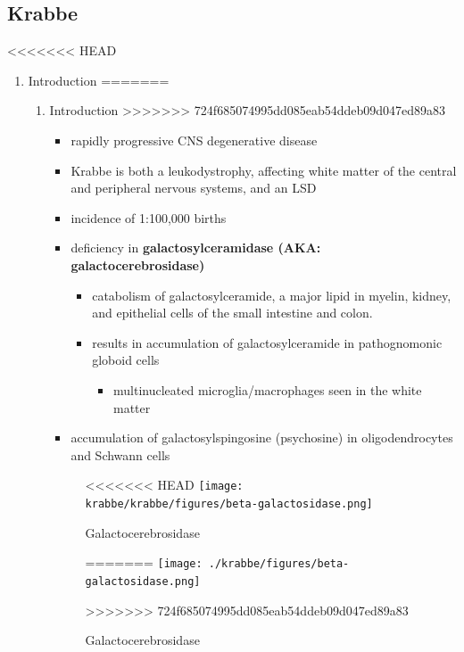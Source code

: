 \documentclass[fontsize=12pt]{scrartcl}
\begin{document}
\begin{enumerate}
\begin{enumerate}
\begin{enumerate}
\begin{enumerate}
\begin{table}[htbp]
\begin{enumerate}
\begin{enumerate}
\begin{table}[htbp]
\begin{enumerate}
\begin{itemize}
\begin{itemize}
\begin{enumerate}
\subsection{Krabbe}
<<<<<<< HEAD
\label{sec:orgd57e94c}
\begin{enumerate}
\item Introduction
\label{sec:org2413475}
=======
\label{sec:org86f48fa}
\begin{enumerate}
\item Introduction
\label{sec:org9404755}
>>>>>>> 724f685074995dd085eab54ddeb09d047ed89a83
\begin{itemize}
\item rapidly progressive CNS degenerative disease
\item Krabbe is both a leukodystrophy, affecting white matter of the central
and peripheral nervous systems, and an LSD
\item incidence of 1:100,000 births
\item deficiency in \textbf{galactosylceramidase (AKA: galactocerebrosidase)} 
\begin{itemize}
\item catabolism of galactosylceramide, a major lipid in myelin, kidney, and epithelial cells of the small intestine and colon.
\item results in accumulation of galactosylceramide in pathognomonic globoid cells
\begin{itemize}
\item multinucleated microglia/macrophages seen in the white matter
\end{itemize}
\end{itemize}
\item accumulation of galactosylspingosine (psychosine) in oligodendrocytes and Schwann cells
\end{itemize}

\begin{figure}[htbp]
\centering
<<<<<<< HEAD
\texttt{[image: krabbe/krabbe/figures/beta-galactosidase.png]}
\caption{\label{fig:orga472af3}Galactocerebrosidase}
=======
\texttt{[image: ./krabbe/figures/beta-galactosidase.png]}
\caption{\label{fig:orgb80b77a}
Galactocerebrosidase}
>>>>>>> 724f685074995dd085eab54ddeb09d047ed89a83
\end{figure}


\end{enumerate}
\end{enumerate}
\end{enumerate}
\end{itemize}
\end{itemize}
\end{enumerate}
\end{table}
\end{enumerate}
\end{enumerate}
\end{table}
\end{enumerate}
\end{enumerate}
\end{enumerate}
\end{enumerate}
\end{document}
